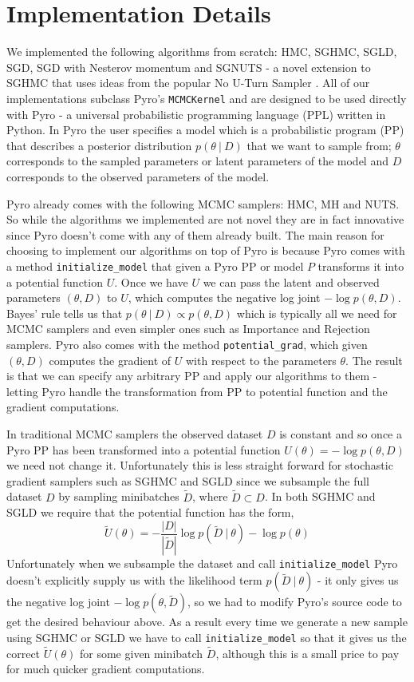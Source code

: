 
\section{Implementation Details}

We implemented the following algorithms from scratch: HMC, SGHMC, SGLD, SGD, SGD with Nesterov momentum and SGNUTS - a novel extension to SGHMC that uses ideas from the popular No U-Turn Sampler \cite{nuts}.  All of our implementations subclass Pyro's \texttt{MCMCKernel} and are designed to be used directly with Pyro \cite{pyro} - a universal probabilistic programming language (PPL) written in Python. In Pyro the user specifies a model which is a probabilistic program (PP) that describes a posterior distribution $p(\theta \: | \: D)$ that we want to sample from; $\theta$ corresponds to the sampled parameters or latent parameters of the model and $D$ corresponds to the observed parameters of the model. 

Pyro already comes with the following MCMC samplers: HMC, MH and NUTS. So while the algorithms we implemented are not novel they are in fact innovative since Pyro doesn't come with any of them already built. The main reason for choosing to implement our algorithms on top of Pyro is because Pyro comes with a method \texttt{initialize\_model} that given a Pyro PP or model $P$ transforms it into a potential function $U$. Once we have $U$ we can pass the latent and observed parameters $(\theta, D)$ to $U$, which computes the negative log joint $- \log p(\theta, D)$. Bayes' rule tells us that  $p(\theta \: | \: D) \propto p(\theta, D)$ which is typically all we need for MCMC samplers and even simpler ones such as Importance and Rejection samplers. Pyro also comes with the method \texttt{potential\_grad}, which given $(\theta, D)$ computes the gradient of $U$ with respect to the parameters $\theta$. The result is that we can specify any arbitrary PP and apply our algorithms to them - letting Pyro handle the transformation from PP to potential function and the gradient computations.

In traditional MCMC samplers the observed dataset $D$ is constant and so once a Pyro PP has been transformed into a potential function $U(\theta) = - \log p(\theta, D)$ we need not change it. Unfortunately this is less straight forward for stochastic gradient samplers such as SGHMC and SGLD since we subsample the full dataset $D$ by sampling minibatches $\tilde{D}$, where $\tilde{D} \subset D$. In both SGHMC and SGLD we require that the potential function has the form,
$$\tilde{U}(\theta) =  -\frac{|D|}{|\tilde{D}|} \log p(\tilde{D} \: | \: \theta) - \log p (\theta)$$
Unfortunately when we subsample the dataset and call \texttt{initialize\_model} Pyro doesn't explicitly supply us with the likelihood term $p(\tilde{D} \: | \: \theta)$ - it only gives us the negative log joint $- \log p(\theta, \tilde{D})$, so we had to modify Pyro's source code to get the desired behaviour above. As a result every time we generate a new sample using SGHMC or SGLD we have to call \texttt{initialize\_model} so that it gives us the correct $\tilde{U}(\theta)$ for some given minibatch $\tilde{D}$, although this is a small price to pay for much quicker gradient computations.